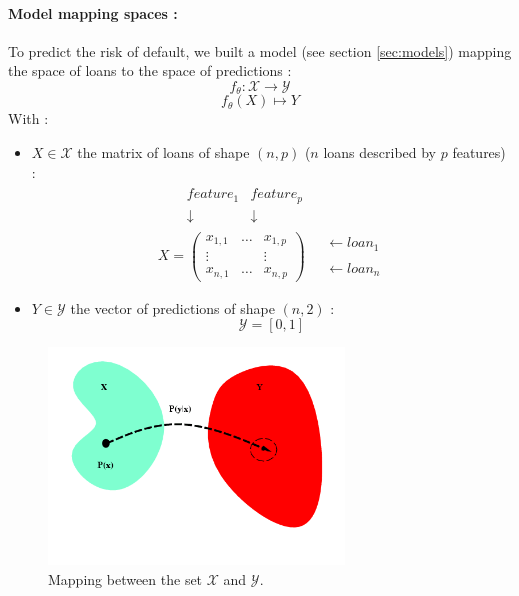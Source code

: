 \paragraph{Model mapping spaces :}
	To predict the risk of default, we built a model (see section \ref{sec:models}) mapping the space of loans to the space of predictions : $$f_\theta:\mathcal{X}\rightarrow \mathcal{Y}$$
	$$f_\theta(X)\mapsto Y$$
	With :
	\begin{itemize}[font=\footnotesize]
		\item $X\in\mathcal{X}$ the matrix of loans of shape $(n,p)$ ($n$ loans described by $p$ features) :
		$$
		\begin{array}{cc}
			\begin{array}{ccc}
				 & ~~~~feature_1 & feature_p\\
				 & ~~~~\downarrow & \downarrow
			\end{array}\\
				X =
			\left(
				\begin{array}{ccc}
					x_{1,1} & \dots & x_{1,p}\\
					\vdots &  & \vdots\\
					x_{n,1} & \dots & x_{n,p}
				\end{array}
			\right) & \begin{array}{c}
		  \leftarrow loan_1\\
		  \\
		  \leftarrow loan_n
		  \end{array}
		  \end{array}$$
		\item $Y\in\mathcal{Y}$ the vector of predictions of shape $(n,2)$ : $$\mathcal{Y} = [0, 1]$$
	\end{itemize}

	\begin{figure}[h]
		\centering
		\includegraphics[width=0.7\textwidth]{images/mapping_proba.png}
		\caption{Mapping between the set $\mathcal{X}$ and $\mathcal{Y}$.}
		\label{fig:mapping_proba}
	\end{figure}

